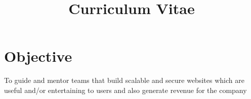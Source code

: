 \documentclass[11pt,a4paper,sans]{moderncv} %
\title{Curriculum Vitae}
\begin{document}
\makecvtitle %


\section{Objective}
To guide and mentor teams that build scalable and secure websites which are useful and/or entertaining
to users and also generate revenue for the company


\end{document}

